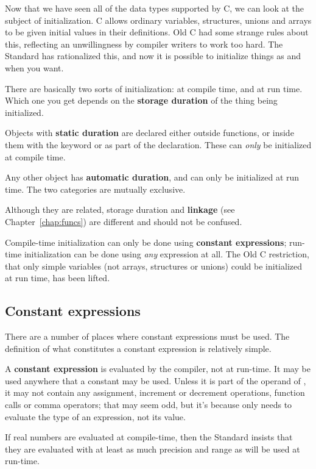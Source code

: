  

  Now that we have seen all of the data types supported by C, we can look at
   the subject of initialization. C allows ordinary variables, structures,
   unions and arrays to be given initial values in their definitions. Old C had
   some strange rules about this, reflecting an unwillingness by compiler
   writers to work too hard. The Standard has rationalized this, and now it is
   possible to initialize things as and when you want.


  There are basically two sorts of initialization: at compile time, and at
   run time. Which one you get depends on the \textbf{storage duration} of
   the thing being initialized.


  Objects with \textbf{static duration} are declared either outside
   functions, or inside them with the keyword \extern{} or
   \static{} as part of the declaration. These can \textit{only} be
   initialized at compile time.


  Any other object has \textbf{automatic duration}, and can only be
   initialized at run time. The two categories are mutually exclusive.


   Although they are related,
   storage duration and \textbf{linkage} (see Chapter~\ref{chap:funcs})
   are different and should not be confused.


  Compile-time initialization can only be done using \textbf{constant
   expressions}; run-time initialization can be done using \textit{any}
   expression at all. The Old C restriction, that only simple variables (not
   arrays, structures or unions) could be initialized at run time, has been
   lifted.


  \subsection{Constant expressions}
   

   There are a number of places where constant expressions must be used. The
    definition of what constitutes a constant expression is relatively
    simple.


   A \textbf{constant expression} is evaluated by the compiler, not at
    run-time. It may be used anywhere that a constant may be used. Unless it is
    part of the operand of \sizeof, it may not contain any
    assignment, increment or decrement operations, function calls or comma
    operators; that may seem odd, but it's because \sizeof{} only
    needs to evaluate the type of an expression, not its value.


   If real numbers are evaluated at compile-time, then the Standard insists
    that they are evaluated with at least as much precision and range as will
    be used at run-time.


